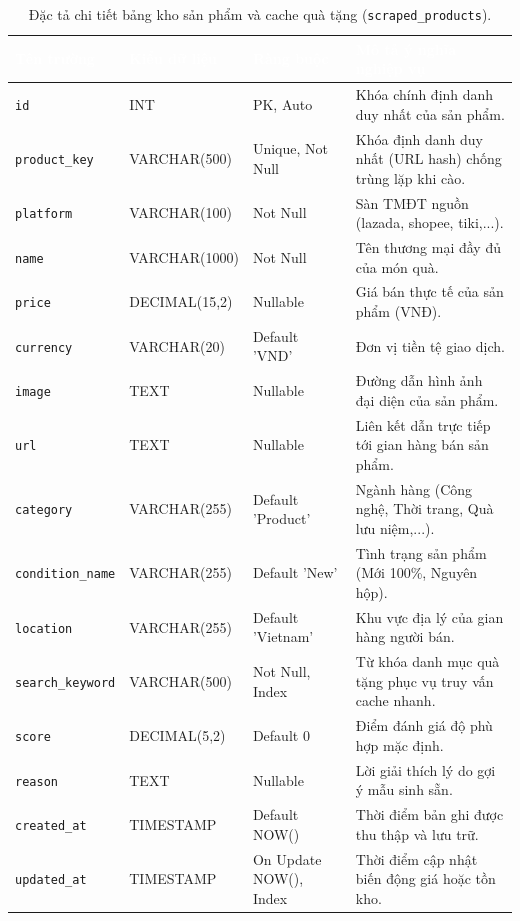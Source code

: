 \begin{table}[htbp]
\centering
\caption{Đặc tả chi tiết bảng kho sản phẩm và cache quà tặng (\texttt{scraped\_products}).}
\label{tab:db_scraped_products}
\small
\renewcommand{\arraystretch}{1.25}
\begin{tabularx}{\textwidth}{|p{3.0cm}|p{2.6cm}|p{2.8cm}|X|}
\hline
\rowcolor{PrimaryBlue}
\textcolor{white}{\textbf{Tên trường}} &
\textcolor{white}{\textbf{Kiểu dữ liệu}} &
\textcolor{white}{\textbf{Ràng buộc}} &
\textcolor{white}{\textbf{Mô tả ý nghĩa nghiệp vụ}} \\
\hline
\texttt{id} & INT & PK, Auto & Khóa chính định danh duy nhất của sản phẩm. \\
\hline
\texttt{product\_key} & VARCHAR(500) & Unique, Not Null & Khóa định danh duy nhất (URL hash) chống trùng lặp khi cào. \\
\hline
\texttt{platform} & VARCHAR(100) & Not Null & Sàn TMĐT nguồn (lazada, shopee, tiki,...). \\
\hline
\texttt{name} & VARCHAR(1000) & Not Null & Tên thương mại đầy đủ của món quà. \\
\hline
\texttt{price} & DECIMAL(15,2) & Nullable & Giá bán thực tế của sản phẩm (VNĐ). \\
\hline
\texttt{currency} & VARCHAR(20) & Default 'VND' & Đơn vị tiền tệ giao dịch. \\
\hline
\texttt{image} & TEXT & Nullable & Đường dẫn hình ảnh đại diện của sản phẩm. \\
\hline
\texttt{url} & TEXT & Nullable & Liên kết dẫn trực tiếp tới gian hàng bán sản phẩm. \\
\hline
\texttt{category} & VARCHAR(255) & Default 'Product' & Ngành hàng (Công nghệ, Thời trang, Quà lưu niệm,...). \\
\hline
\texttt{condition\_name} & VARCHAR(255) & Default 'New' & Tình trạng sản phẩm (Mới 100\%, Nguyên hộp). \\
\hline
\texttt{location} & VARCHAR(255) & Default 'Vietnam' & Khu vực địa lý của gian hàng người bán. \\
\hline
\texttt{search\_keyword} & VARCHAR(500) & Not Null, Index & Từ khóa danh mục quà tặng phục vụ truy vấn cache nhanh. \\
\hline
\texttt{score} & DECIMAL(5,2) & Default 0 & Điểm đánh giá độ phù hợp mặc định. \\
\hline
\texttt{reason} & TEXT & Nullable & Lời giải thích lý do gợi ý mẫu sinh sẵn. \\
\hline
\texttt{created\_at} & TIMESTAMP & Default NOW() & Thời điểm bản ghi được thu thập và lưu trữ. \\
\hline
\texttt{updated\_at} & TIMESTAMP & On Update NOW(), Index & Thời điểm cập nhật biến động giá hoặc tồn kho. \\
\hline
\end{tabularx}
\end{table}

